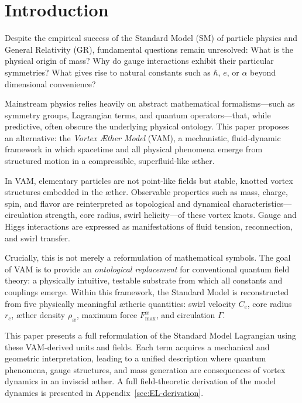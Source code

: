 \section{Introduction}\label{sec:inleiding}

Despite the empirical success of the Standard Model (SM) of particle physics and General Relativity (GR), fundamental questions remain unresolved: What is the physical origin of mass? Why do gauge interactions exhibit their particular symmetries? What gives rise to natural constants such as $\hbar$, $e$, or $\alpha$ beyond dimensional convenience?

Mainstream physics relies heavily on abstract mathematical formalisms—such as symmetry groups, Lagrangian terms, and quantum operators—that, while predictive, often obscure the underlying physical ontology. This paper proposes an alternative: the \emph{Vortex Æther Model} (VAM), a mechanistic, fluid-dynamic framework in which spacetime and all physical phenomena emerge from structured motion in a compressible, superfluid-like æther.

In VAM, elementary particles are not point-like fields but stable, knotted vortex structures embedded in the æther. Observable properties such as mass, charge, spin, and flavor are reinterpreted as topological and dynamical characteristics—circulation strength, core radius, swirl helicity—of these vortex knots. Gauge and Higgs interactions are expressed as manifestations of fluid tension, reconnection, and swirl transfer.

Crucially, this is not merely a reformulation of mathematical symbols. The goal of VAM is to provide an \emph{ontological replacement} for conventional quantum field theory: a physically intuitive, testable substrate from which all constants and couplings emerge. Within this framework, the Standard Model is reconstructed from five physically meaningful ætheric quantities: swirl velocity $C_e$, core radius $r_c$, æther density $\rho_\text{\ae}$, maximum force $F^{\text{\ae}}_{\text{max}}$, and circulation $\Gamma$.

This paper presents a full reformulation of the Standard Model Lagrangian using these VAM-derived units and fields. Each term acquires a mechanical and geometric interpretation, leading to a unified description where quantum phenomena, gauge structures, and mass generation are consequences of vortex dynamics in an inviscid æther. A full field-theoretic derivation of the model dynamics is presented in Appendix~\ref{sec:EL-derivation}.

